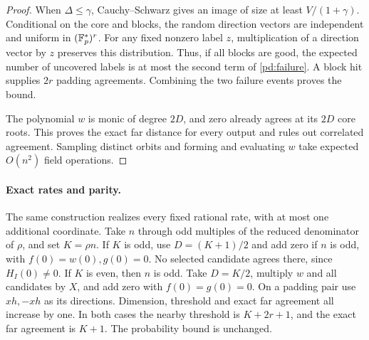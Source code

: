 \begin{proof}
When $\Delta\le\gamma$, Cauchy--Schwarz gives an image of size at
least $V/(1+\gamma)$. Conditional on the core and blocks, the random
direction vectors are independent and uniform in $(\mathbb F_p^*)^r$.
For any fixed nonzero label $z$, multiplication of a direction vector
by $z$ preserves this distribution. Thus, if all blocks are good, the
expected number of uncovered labels is at most the second term of
\eqref{pd:failure}. A block hit supplies $2r$ padding agreements.
Combining the two failure events proves the bound.

The polynomial $w$ is monic of degree $2D$, and zero already agrees
at its $2D$ core roots. This proves the exact far distance for every
output and rules out correlated agreement. Sampling distinct orbits
and forming and evaluating $w$ take expected $O(n^2)$ field operations.
\end{proof}

\paragraph{Exact rates and parity.}
The same construction realizes every fixed rational rate, with at most
one additional coordinate. Take $n$ through odd multiples of the reduced
denominator of $\rho$, and set $K=\rho n$. If $K$ is odd, use
$D=(K+1)/2$ and add zero if $n$ is odd, with $f(0)=w(0),g(0)=0$.
No selected candidate agrees there, since $H_I(0)\ne0$. If $K$ is
even, then $n$ is odd. Take $D=K/2$, multiply $w$ and all candidates
by $X$, and add zero with $f(0)=g(0)=0$. On a padding pair use
$x h,-x h$ as its directions. Dimension, threshold and exact far
agreement all increase by one. In both cases the nearby threshold is
$K+2r+1$, and the exact far agreement is $K+1$.
The probability bound is unchanged.

